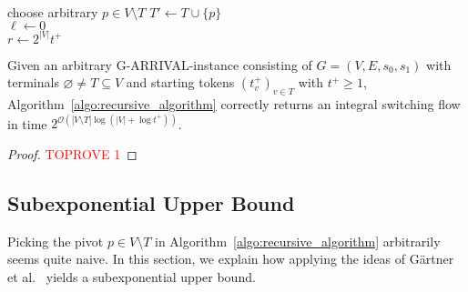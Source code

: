 \documentclass[a4paper,UKenglish,cleveref, autoref, thm-restate]{lipics-v2021}
\newcommand{\bigO}{\mathcal{O}}
\let\emptyset\varnothing
\newcommand{\problem}[1]{\textrm{#1}}
\newcommand{\garrival}{\problem{G-ARRIVAL}}
\begin{document}
\begin{algorithm}
\DontPrintSemicolon
\caption{}
\label{algo:recursive_algorithm}
\Indm{}\\
\Indp
    choose arbitrary $p \in V \setminus T$  
    $T' \gets T \cup \{p\}$\\
    $\ell \gets 0$\\
    $r \gets 2^{|V|} t^+$\\
\end{algorithm}


\begin{lemma}
\label{lemma:correctness_algo_1}
    Given an arbitrary \garrival-instance consisting of $G = (V, E, s_0, s_1)$ with terminals $\emptyset \neq T \subseteq V$ and starting tokens $(t^+_v)_{v \in T}$ with $t^+ \geq 1$, Algorithm~\ref{algo:recursive_algorithm} correctly returns an integral switching flow in time $ 2^{\bigO \left(|V \setminus T| \log ( |V| + \log t^+ ) \right)}$.
\end{lemma}
\begin{proof}\textcolor{red}{TOPROVE 1}\end{proof}


\subsection{Subexponential Upper Bound}
\label{ssec:subexponential_algo}

Picking the pivot $p \in V \setminus T$ in Algorithm~\ref{algo:recursive_algorithm} arbitrarily seems quite naive. In this section, we explain how applying the ideas of Gärtner et al.\@~\cite{gartnerSubexponentialAlgorithmARRIVAL2021} yields a subexponential upper bound.
\end{document}
